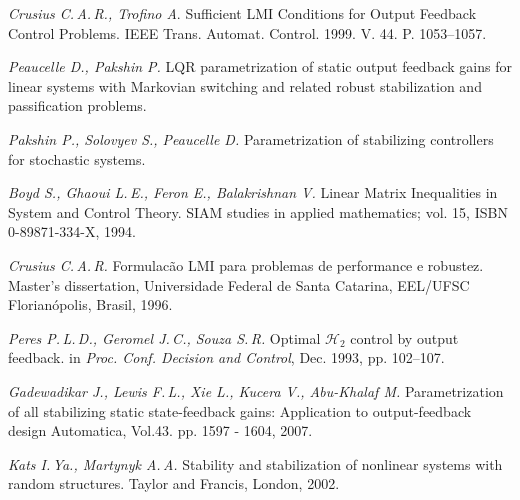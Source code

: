 

\begin{thebibliography}{wlab}

\emph{Crusius C.\,A.\,R., Trofino A}.
\newblock Sufficient LMI Conditions for Output Feedback Control Problems.
\newblock IEEE Trans. Automat. Control. 1999. V. 44. P. 1053–1057.

\emph{Peaucelle D., Pakshin P.}
\newblock LQR parametrization of static output feedback gains for linear systems with Markovian switching and related robust stabilization and passification problems.

\emph{Pakshin P., Solovyev S., Peaucelle D.}
\newblock Parametrization of stabilizing controllers for stochastic systems.

\emph{Boyd S., Ghaoui L.\,E., Feron E., Balakrishnan V.}
\newblock Linear Matrix Inequalities in System and Control Theory.
\newblock SIAM studies in applied mathematics; vol. 15, ISBN 0-89871-334-X, 1994.

\emph{Crusius C.\,A.\,R.}
\newblock Formulac\~{a}o LMI para problemas de performance e robustez.
\newblock Master’s dissertation, Universidade Federal de Santa Catarina, EEL/UFSC Florian\'{o}polis, Brasil, 1996.

\emph{Peres P.\,L.\,D., Geromel J.\,C., Souza S.\,R.}
\newblock Optimal $\mathcal{H}_2$ control by output feedback.
\newblock in \emph{Proc. Conf. Decision and Control}, Dec. 1993, pp. 102–107.

\emph{Gadewadikar J., Lewis F.\,L., Xie L., Kucera V., Abu-Khalaf M.}
\newblock Parametrization of all stabilizing static state-feedback gains: Application to output-feedback design
\newblock Automatica, Vol.43. pp. 1597 - 1604, 2007.

\pagebreak

\emph{Kats I.\,Ya., Martynyk A.\,A.}
\newblock Stability and stabilization of nonlinear systems with random structures.
\newblock Taylor and Francis, London, 2002.


\end{thebibliography}

